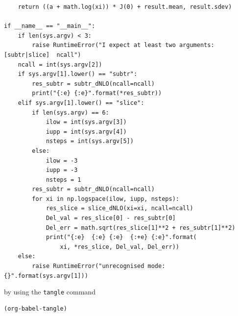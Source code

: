 \documentclass[11pt]{article}
\begin{document}
\begin{verbatim}
    return ((a + math.log(xi)) * J(0) + result.mean, result.sdev)

if __name__ == "__main__":
    if len(sys.argv) < 3:
        raise RuntimeError("I expect at least two arguments:  [subtr|slice]  ncall")
    ncall = int(sys.argv[2])
    if sys.argv[1].lower() == "subtr":
        res_subtr = subtr_dNLO(ncall=ncall)
        print("{:e} {:e}".format(*res_subtr))
    elif sys.argv[1].lower() == "slice":
        if len(sys.argv) == 6:
            ilow = int(sys.argv[3])
            iupp = int(sys.argv[4])
            nsteps = int(sys.argv[5])
        else:
            ilow = -3
            iupp = -3
            nsteps = 1
        res_subtr = subtr_dNLO(ncall=ncall)
        for xi in np.logspace(ilow, iupp, nsteps):
            res_slice = slice_dNLO(xi=xi, ncall=ncall)
            Del_val = res_slice[0] - res_subtr[0]
            Del_err = math.sqrt(res_slice[1]**2 + res_subtr[1]**2)
            print("{:e}  {:e} {:e}  {:+e} {:e}".format(
                xi, *res_slice, Del_val, Del_err))
    else:
        raise RuntimeError("unrecognised mode: {}".format(sys.argv[1]))
\end{verbatim}
by using the \texttt{tangle} command
\begin{verbatim}
(org-babel-tangle)
\end{verbatim}
\end{document}
